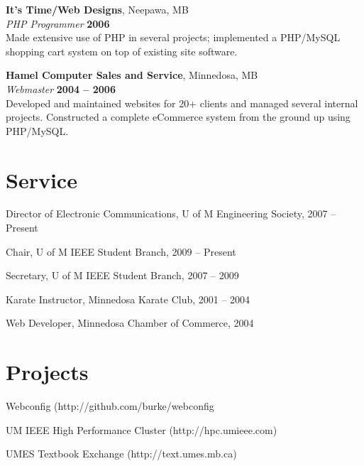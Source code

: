 \documentclass[margin,line,letterpaper]{resume}
\begin{document}
\begin{resume}
  {\bf It's Time/Web Designs}, Neepawa, MB \vspace{2mm}\\\vspace{1mm}%
  {\sl PHP Programmer} \hfill {\bf 2006}\\
  Made extensive use of PHP in several projects; implemented a PHP/MySQL shopping cart
  system on top of existing site software.

  {\bf Hamel Computer Sales and Service}, Minnedosa, MB \vspace{2mm}\\\vspace{1mm}%
  {\sl Webmaster} \hfill {\bf 2004 -- 2006}\\
  Developed and maintained websites for 20+ clients and managed several internal projects.
  Constructed a complete eCommerce system from the ground up using PHP/MySQL.

  \newpage
  \section{\mysidestyle Service}

  \begin{list2}
    \item Director of Electronic Communications, U of M Engineering Society, 2007 -- Present
    \item Chair, U of M IEEE Student Branch, 2009 -- Present
    \item Secretary, U of M IEEE Student Branch, 2007 -- 2009
   \item Karate Instructor, Minnedosa Karate Club, 2001 -- 2004
    \item Web Developer, Minnedosa Chamber of Commerce, 2004
  \end{list2}

  \section{\mysidestyle Projects}

  \begin{list2}
    \item Webconfig (http://github.com/burke/webconfig
    \item UM IEEE High Performance Cluster (http://hpc.umieee.com)
   \item UMES Textbook Exchange (http://text.umes.mb.ca)
  \end{list2}



\end{resume}
\end{document}
